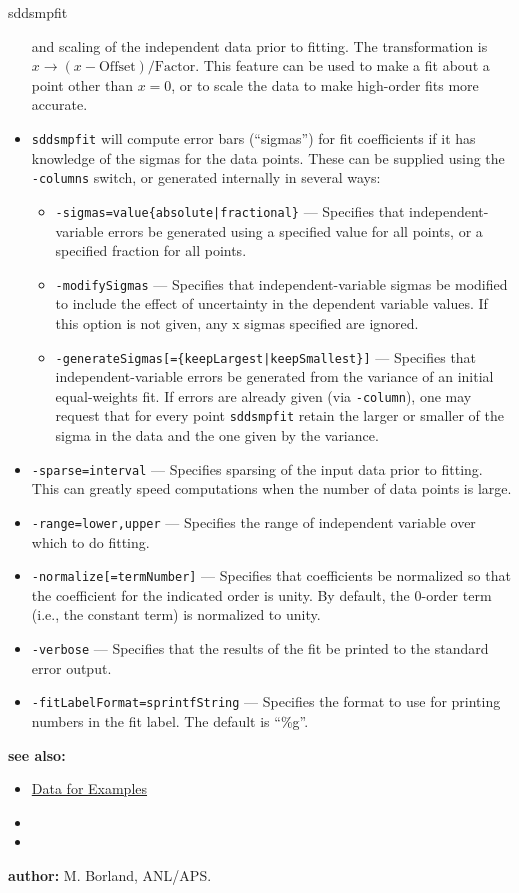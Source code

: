 \begin{sddsprog}{sddsmpfit}
\begin{itemize}
      and scaling of the independent data prior to fitting. The transformation
      is $x \rightarrow (x - \mathrm{Offset})/\mathrm{Factor}$. This feature
      can be used to make a fit about a point other than $x=0$, or to scale the
      data to make high-order fits more accurate.
    \item \verb|sddsmpfit| will compute error bars (``sigmas'') for fit
      coefficients if it has knowledge of the sigmas for the data points.
      These can be supplied using the \verb|-columns| switch, or generated
      internally in several ways:
      \begin{itemize}
      \item \verb!-sigmas=value{absolute|fractional}! --- Specifies that
        independent-variable errors be generated using a specified value for
        all points, or a specified fraction for all points.
      \item \verb|-modifySigmas| --- Specifies that independent-variable sigmas
        be modified to include the effect of uncertainty in the dependent
        variable values. If this option is not given, any x sigmas specified
        are ignored.
      \item \verb!-generateSigmas[={keepLargest|keepSmallest}]! --- Specifies
        that independent-variable errors be generated from the variance of an
        initial equal-weights fit. If errors are already given (via
        \verb|-column|), one may request that for every point \verb|sddsmpfit|
        retain the larger or smaller of the sigma in the data and the one given
        by the variance.
      \end{itemize}
    \item \verb|-sparse=interval| --- Specifies sparsing of the input data
      prior to fitting. This can greatly speed computations when the number of
      data points is large.
    \item \verb|-range=lower,upper| --- Specifies the range of independent
      variable over which to do fitting.
    \item \verb|-normalize[=termNumber]| --- Specifies that coefficients be
      normalized so that the coefficient for the indicated order is unity. By
      default, the 0-order term (i.e., the constant term) is normalized to
      unity.
    \item \verb|-verbose| --- Specifies that the results of the fit be printed
      to the standard error output.
    \item \verb|-fitLabelFormat=sprintfString| --- Specifies the format to use
      for printing numbers in the fit label. The default is ``\%g''.
    \end{itemize}
  \item \textbf{see also:}
    \begin{itemize}
    \item \hyperref[exampleData]{Data for Examples}
    \item {}
    \item {}
    \end{itemize}
  \item \textbf{author:} M. Borland, ANL/APS.
\end{sddsprog}

